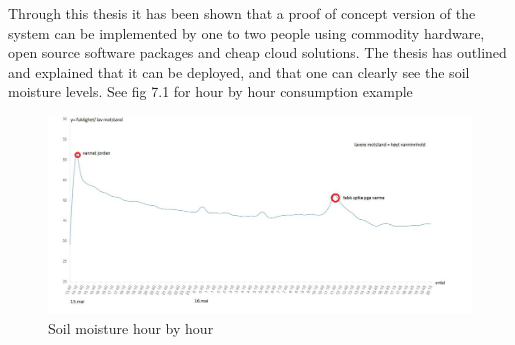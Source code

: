 \documentclass[]{uiophd}
\begin{document}
Through this thesis  it has been shown that a proof of concept version of the system can be implemented by one to two people using commodity hardware, open source software packages and cheap cloud solutions. The thesis has outlined and explained that it can be deployed, and that one can clearly see the soil moisture levels. See fig 7.1 for hour by hour consumption example
 \begin{figure}[h]
\caption{Soil moisture hour by hour}
\centering
\includegraphics[width=14cm]{warter_hourbyhour.png}
\end{figure}
\end{document}
